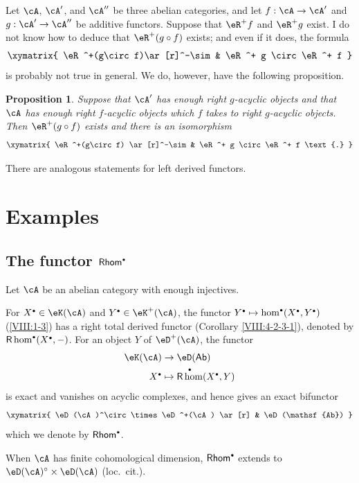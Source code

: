 \documentclass[12pt,oneside,english]{smfbook}
\DeclareMathOperator{\rhom}{\mathsf{R}\hom}
\newtheorem{proposition}[subsubsection]{Proposition}
\let\oldbullet\bullet
\renewcommand{\bullet}{\textnormal{\tiny$\oldbullet$}}
\begin{document}
Let $\cA$, $\cA'$, and $\cA''$ be three abelian categories, and let $f:\cA\to\cA'$ and $g:\cA'\to\cA''$ be additive functors. Suppose that $\eR^+f$ and $\eR^+g$ exist. I do not know how to deduce that $\eR^+(g\circ f)$ exists; and even if it does, the formula
\[\xymatrix{
  \eR^+(g\circ f)\ar[r]^-\sim
    & \eR^+ g \circ \eR^+ f
}\]
is probably not true in general. We do, however, have the following proposition.

\begin{proposition}\label{VIII:4-3-1}
Suppose that $\cA'$ has enough right $g$-acyclic objects and that $\cA$ has enough right $f$-acyclic objects which $f$ takes to right $g$-acyclic objects. Then $\eR^+(g\circ f)$ exists and there is an isomorphism
\[\xymatrix{
  \eR^+(g\circ f) \ar[r]^-\sim
    & \eR^+ g \circ \eR^+ f \text{.}
}\]
\end{proposition}

There are analogous statements for left derived functors.

\section{Examples}\label{VIII:6} %

\subsection{The functor \texorpdfstring{$\mathsf{Rhom}^\bullet$}{Hom*}}\label{VIII:6-1}

Let $\cA$ be an abelian category with enough injectives.

For $X^\bullet\in\eK(\cA)$ and $Y^\bullet\in\eK^+(\cA)$, the functor $Y^\bullet\mapsto\hom^\bullet(X^\bullet,Y^\bullet)$ (\ref{VIII:1-3}) has a right total derived functor (Corollary \ref{VIII:4-2-3-1}), denoted by $\rhom^\bullet(X^\bullet,-)$. For an object $Y$ of $\eD^+(\cA)$, the functor
\begin{align*}
  \eK(\cA) &\to \eD(\mathsf{Ab}) \\
  X^\bullet &\mapsto \rhom^\bullet(X^\bullet,Y)
\end{align*}
is exact and vanishes on acyclic complexes, and hence gives an exact bifunctor
\[\xymatrix{
  \eD(\cA)^\circ \times \eD^+(\cA) \ar[r]
    & \eD(\mathsf{Ab})
}\]
which we denote by $\mathsf{Rhom}^\bullet$.

When $\cA$ has finite cohomological dimension, $\mathsf{Rhom}^\bullet$ extends to $\eD(\cA)^\circ\times\eD(\cA)$ (loc.\ cit.).
\end{document}
